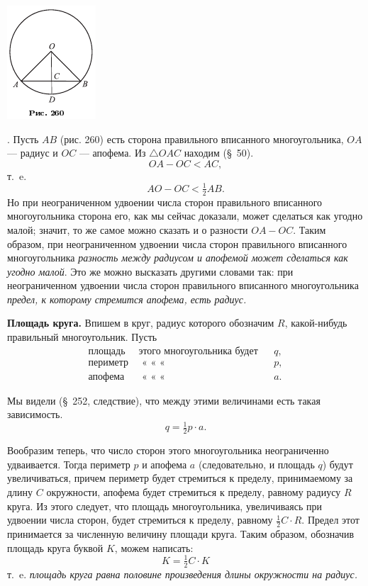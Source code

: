 \documentclass[oneside]{book}
\begin{document}
\includegraphics{pics/ris-260}

.
Пусть $AB$ (рис. 260) есть сторона правильного вписанного многоугольника, $OA$ — радиус и $OC$ — апофема.
Из $\triangle OAC$ находим (§~50).
\[OA-OC<AC,\]
т.~e.
\[AO-OC<\tfrac12 AB.\]
Но при неограниченном удвоении числа сторон правильного вписанного многоугольника сторона его, как мы сейчас доказали, может сделаться как угодно малой;
значит, то же самое можно сказать и о разности $OA-OC$.
Таким образом, при неограниченном удвоении числа сторон правильного вписанного многоугольника \emph{разность между радиусом и апофемой может сделаться как угодно малой}.
Это же можно высказать другими словами так:
при неограниченном удвоении числа сторон правильного вписанного многоугольника \emph{предел, к которому стремится апофема, есть радиус.}

\textbf{Площадь круга.}
Впишем в круг, радиус которого обозначим $R$, какой-нибудь правильный многоугольник.
Пусть
\begin{align*}
\text{площадь}~&\text{этого многоугольника будет}&&q,
\\
\text{периметр}~&\text{\ \ «\ \ \ \ \ \ \ \ \ \ \ \ «\ \ \ \ \ \ \ \ \ \ \ \ \ \ \ «\ }&&p,
\\
\text{апофема}~&\text{\ \ «\ \ \ \ \ \ \ \ \ \ \ \ «\ \ \ \ \ \ \ \ \ \ \ \ \ \ \ «\ }&&a.
\end{align*}

Мы видели (§~252, следствие), что между этими величинами есть такая зависимость.
\[q=\tfrac12p\cdot a.\]

Вообразим теперь, что число сторон этого многоугольника неограниченно удваивается.
Тогда периметр $p$ и апофема  $a$ (следовательно, и площадь $q$) будут увеличиваться, причем периметр будет стремиться к пределу, принимаемому за длину $C$ окружности, апофема будет стремиться к пределу, равному радиусу $R$ круга.
Из этого следует, что площадь многоугольника, увеличиваясь при удвоении числа сторон, будет стремиться к пределу, равному $\tfrac12 C\cdot R$.
Предел этот принимается за численную величину площади круга.
Таким образом, обозначив площадь круга буквой $K$, можем написать:
\[K=\tfrac12 C\cdot K\]
т.~e. \emph{площадь круга равна половине произведения длины окружности на радиус.}
\end{document}
